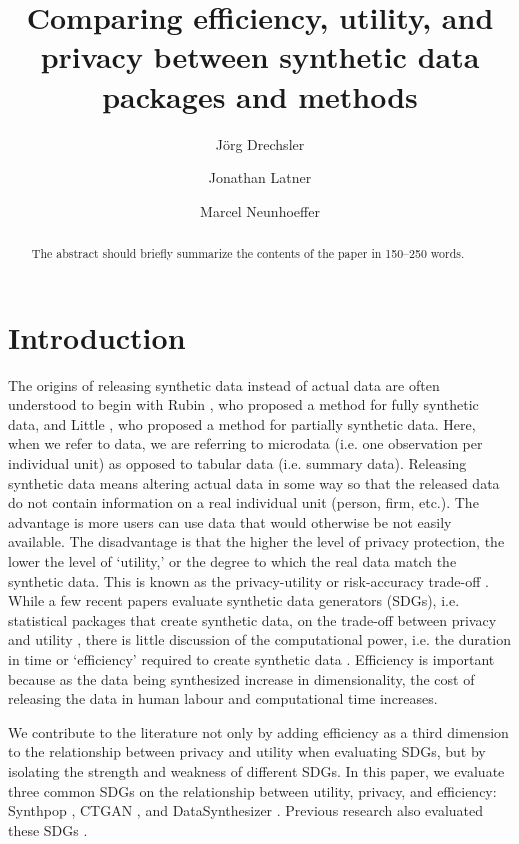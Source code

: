 \documentclass[runningheads]{llncs}
\title{Comparing efficiency, utility, and privacy between synthetic data packages and methods}
\author{Jörg Drechsler\inst{1 (\text{\Letter})} \and
Jonathan Latner\inst{1 \orcidlink{0000-0002-1825-0097}} \and
Marcel Neunhoeffer\inst{1 \orcidlink{0000-0002-9137-5785}}}
\institute{Institute for Employment Research, Nuremberg, Germany
\email{{joerg.drechsler,jonathan.latner,marcel.neunhoeffer}@iab.de}}
\begin{document}
\maketitle              %
%
\begin{abstract}
The abstract should briefly summarize the contents of the paper in
150--250 words.

\end{abstract}


\clearpage

\section{Introduction}


The origins of releasing synthetic data instead of actual data are often understood to begin with Rubin \cite{rubin1993statistical}, who proposed a method for fully synthetic data, and Little \cite{little1993statistical}, who proposed a method for partially synthetic data.  Here, when we refer to data, we are referring to microdata (i.e. one observation per individual unit) as opposed to tabular data (i.e. summary data).  Releasing synthetic data means altering actual data in some way so that the released data do not contain information on a real individual unit (person, firm, etc.).  The advantage is more users can use data that would otherwise be not easily available.  The disadvantage is that the higher the level of privacy protection, the lower the level of `utility,' or the degree to which the real data match the synthetic data.  This is known as the privacy-utility or risk-accuracy trade-off \citep{reiter2010releasing}.  While a few recent papers evaluate synthetic data generators (SDGs), i.e. statistical packages that create synthetic data, on the trade-off between privacy and utility \citep{little2022comparing,dankar2021fake}, there is little discussion of the computational power, i.e. the duration in time or `efficiency' required to create synthetic data \citep{jordon2022synthetic}.  Efficiency is important because as the data being synthesized increase in dimensionality, the cost of releasing the data in human labour and computational time increases.  

We contribute to the literature not only by adding efficiency as a third dimension to the relationship between privacy and utility when evaluating SDGs, but by isolating the strength and weakness of different SDGs.  In this paper, we evaluate three common SDGs on the relationship between utility, privacy, and efficiency: Synthpop \cite{nowok2016synthpop}, CTGAN \cite{patki2016synthetic}, and DataSynthesizer \cite{ping2017datasynthesizer}.  Previous research also evaluated these SDGs \cite{dankar2021fake,little2022comparing}.  
\end{document}
